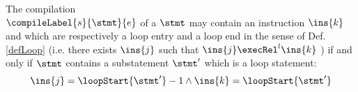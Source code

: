 \begin{compProp}\label{compile:prop:compProp4}  %

The compilation \\ $\compileLabel{s}{\stmt}{e}$ of a $\stmt$ may contain an instruction $\ins{k}$ and   which are respectively 
a loop entry and a loop end  in the sense of Def.
\ref{defLoop} (i.e. there exists $\ins{j}$ such that $\ins{j} \execRel^{l} \ins{k}$ ) if and only if  $\stmt$  contains 
 a substatement $\stmt'$ which is a loop statement:
 $$ \ins{j} = \loopStart{\stmt'}  - 1 \wedge  \ins{k} = \loopStart{\stmt'}  $$


	   
              
             

\end{compProp}
 






